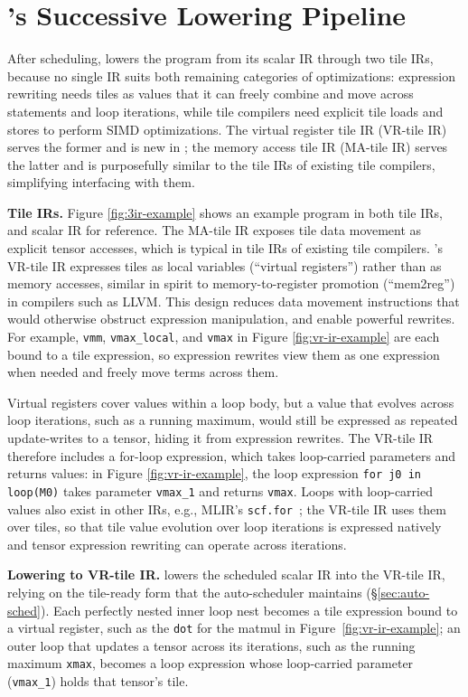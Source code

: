 \section{\NAME{}'s Successive Lowering Pipeline}
\label{sec:opt-pipeline}

After scheduling, \NAME{} lowers the program from its scalar IR through two tile IRs,
because no single IR suits both remaining categories of
optimizations: expression rewriting needs tiles as values that it can freely combine and move
across statements and loop iterations, while tile compilers need explicit tile loads and stores
to perform SIMD optimizations.
The virtual register tile IR (VR-tile IR) serves the former and is new in \NAME{};
the memory access tile IR (MA-tile IR) serves the latter and is purposefully similar to
the tile IRs of existing tile compilers, simplifying interfacing with them.

\textbf{Tile IRs.}
Figure \ref{fig:3ir-example} shows an example program in both tile IRs,
and scalar IR for reference.
The MA-tile IR exposes tile data movement as explicit tensor accesses,
which is typical in tile IRs of existing tile compilers.
\NAME{}'s VR-tile IR expresses tiles as local variables (``virtual registers'')
rather than as memory accesses, similar in spirit to memory-to-register promotion
(``mem2reg'') in compilers such as LLVM.
This design reduces data movement instructions that would otherwise obstruct expression
manipulation, and enable powerful rewrites.
For example, \texttt{vmm}, \texttt{vmax\_local}, and \texttt{vmax} in Figure \ref{fig:vr-ir-example}
are each bound to a tile expression, so expression rewrites view them as one
expression when needed and freely move terms across them.

Virtual registers cover values within a loop body, but a value that evolves across loop
iterations, such as a running maximum, would still be expressed as repeated update-writes
to a tensor, hiding it from expression rewrites.
The VR-tile IR therefore includes a for-loop expression, which takes loop-carried
parameters and returns values: in Figure \ref{fig:vr-ir-example}, the loop expression
\texttt{for j0 in loop(M0)}
takes parameter \texttt{vmax\_1} and returns \texttt{vmax}.
Loops with loop-carried values also exist in other IRs, e.g., MLIR's \texttt{scf.for}~\cite{mlir};
the VR-tile IR uses them over tiles, so that tile value evolution over loop iterations
is expressed natively and tensor expression rewriting can operate across iterations.

\textbf{Lowering to VR-tile IR.}
\NAME{} lowers the scheduled scalar IR into the VR-tile IR,
relying on the tile-ready form that the auto-scheduler maintains (\S\ref{sec:auto-sched}).
Each perfectly nested inner loop nest becomes a tile expression bound to a virtual register,
such as the \texttt{dot} for the matmul in Figure~\ref{fig:vr-ir-example};
an outer loop that updates a tensor across its iterations, such as the running maximum
\texttt{xmax}, becomes a loop expression whose loop-carried parameter (\texttt{vmax\_1})
holds that tensor's tile.

